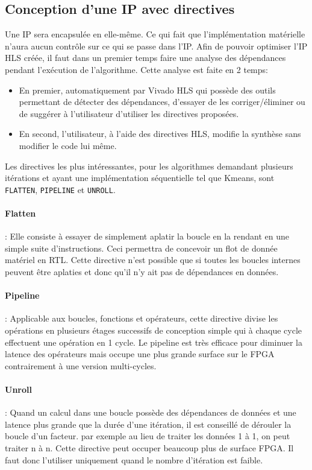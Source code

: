 \documentclass[12pt,a4paper]{article}
\begin{document}
\subsection{Conception d'une IP avec directives}
Une IP sera encapsulée en elle-même. Ce qui fait que l'implémentation matérielle n'aura aucun contrôle sur ce qui se passe dans l'IP.
Afin de pouvoir optimiser l'IP HLS créée, il faut dans un premier temps faire une analyse des dépendances pendant l'exécution de l'algorithme. Cette analyse est faite en 2 temps: 
\begin{itemize}
\item En premier, automatiquement par Vivado HLS qui possède des outils permettant de détecter des dépendances, d'essayer de les corriger/éliminer ou de suggérer à l'utilisateur d'utiliser les directives proposées.
\item En second, l'utilisateur, à l'aide des directives HLS, modifie la synthèse sans modifier le code lui même.
\end{itemize}
 Les directives les plus intéressantes, pour les algorithmes demandant plusieurs itérations et ayant une implémentation séquentielle tel que Kmeans, sont \texttt{FLATTEN}, \texttt{PIPELINE} et \texttt{UNROLL}.
 
\paragraph{Flatten} : Elle consiste à essayer de simplement aplatir la boucle en la rendant en une simple suite d'instructions. Ceci permettra de concevoir un flot de donnée matériel en RTL. Cette directive n'est possible que si toutes les boucles internes peuvent être aplaties et donc qu'il n'y ait pas de dépendances en données.
\paragraph{Pipeline} : Applicable aux boucles, fonctions et opérateurs, cette directive divise les opérations en plusieurs étages successifs de conception simple qui à chaque cycle effectuent une opération en 1 cycle. Le pipeline est très efficace pour diminuer la latence des opérateurs mais occupe une plus grande surface sur le FPGA contrairement à une version multi-cycles.

\paragraph{Unroll} : Quand un calcul dans une boucle possède des dépendances de données et une latence plus grande que la durée d'une itération, il est conseillé de dérouler la boucle d'un facteur. par exemple au lieu de traiter les données 1 à 1, on peut traiter n à n. Cette directive peut occuper beaucoup plus de surface FPGA. Il faut donc l'utiliser uniquement quand le nombre d'itération est faible.
\end{document}
